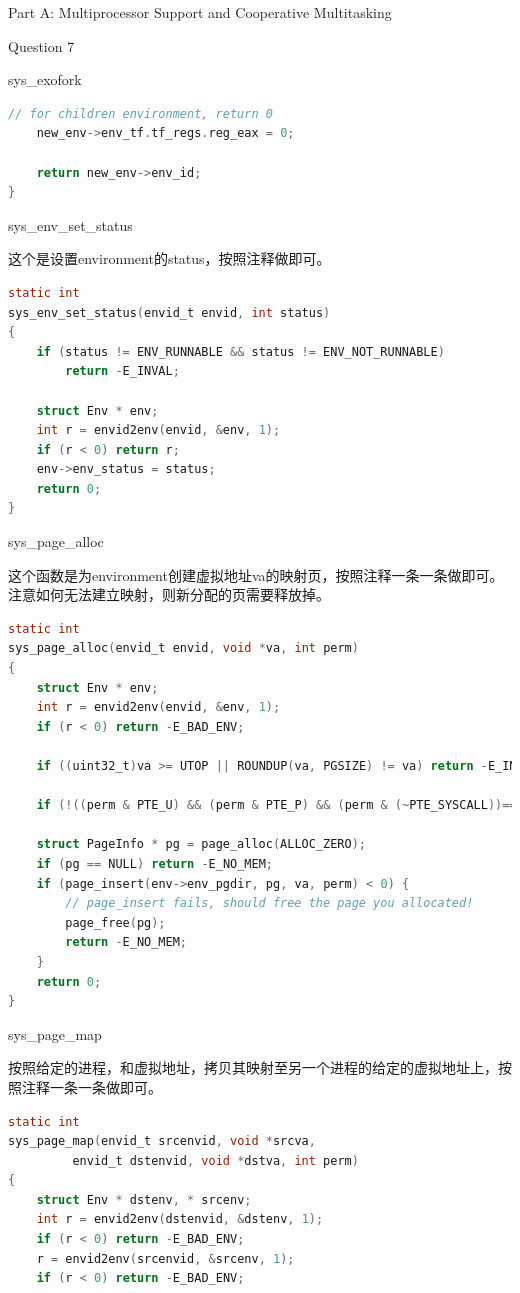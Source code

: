 \documentclass[GBK,winfonts,a4paper,10pt]{ctexart}
\begin{document}
\begin{section}{Part A: Multiprocessor Support and Cooperative Multitasking}
\begin{subsection}{Question 7}
\begin{subsubsection}{sys\_exofork}
\begin{lstlisting}[language=C]
	// for children environment, return 0
	new_env->env_tf.tf_regs.reg_eax = 0;

	return new_env->env_id;
}
\end{lstlisting}
\end{subsubsection}

\begin{subsubsection}{sys\_env\_set\_status}
\par
这个是设置environment的status，按照注释做即可。
\begin{lstlisting}[language=C]
static int
sys_env_set_status(envid_t envid, int status)
{
	if (status != ENV_RUNNABLE && status != ENV_NOT_RUNNABLE) 
		return -E_INVAL;

	struct Env * env;
	int r = envid2env(envid, &env, 1);
	if (r < 0) return r;
	env->env_status = status;
	return 0;
}
\end{lstlisting}
\end{subsubsection}

\begin{subsubsection}{sys\_page\_alloc}
\par
这个函数是为environment创建虚拟地址va的映射页，按照注释一条一条做即可。注意如何无法建立映射，则新分配的页需要释放掉。
\begin{lstlisting}[language=C]
static int
sys_page_alloc(envid_t envid, void *va, int perm)
{
	struct Env * env;
	int r = envid2env(envid, &env, 1);
	if (r < 0) return -E_BAD_ENV;

	if ((uint32_t)va >= UTOP || ROUNDUP(va, PGSIZE) != va) return -E_INVAL;
	
	if (!((perm & PTE_U) && (perm & PTE_P) && (perm & (~PTE_SYSCALL))==0)) return -E_INVAL;

	struct PageInfo * pg = page_alloc(ALLOC_ZERO);
	if (pg == NULL) return -E_NO_MEM;
	if (page_insert(env->env_pgdir, pg, va, perm) < 0) {
		// page_insert fails, should free the page you allocated!  
		page_free(pg);
		return -E_NO_MEM;
	}
	return 0;
}
\end{lstlisting}
\end{subsubsection}

\begin{subsubsection}{sys\_page\_map}
\par
按照给定的进程，和虚拟地址，拷贝其映射至另一个进程的给定的虚拟地址上，按照注释一条一条做即可。
\begin{lstlisting}[language=C]
static int
sys_page_map(envid_t srcenvid, void *srcva,
	     envid_t dstenvid, void *dstva, int perm)
{
	struct Env * dstenv, * srcenv;
	int r = envid2env(dstenvid, &dstenv, 1);
	if (r < 0) return -E_BAD_ENV;
	r = envid2env(srcenvid, &srcenv, 1);
	if (r < 0) return -E_BAD_ENV;


\end{lstlisting}
\end{subsubsection}
\end{subsection}
\end{section}
\end{document}
